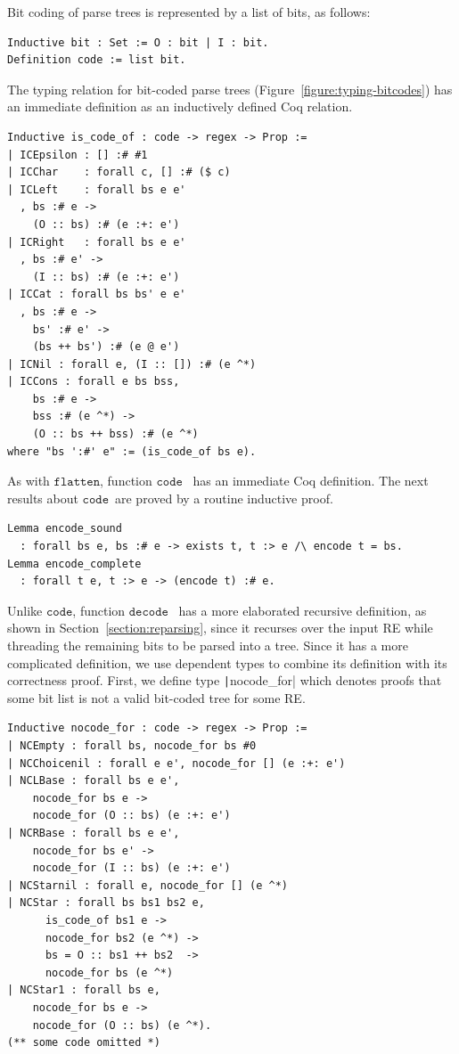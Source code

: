 \documentclass[oneside,12pt]{scrbook}
\theoremstyle{definition}
\newcommand{\flatten}{\ensuremath{\texttt{flatten}}}
\newcommand{\code}{\ensuremath{\texttt{code}}}
\newcommand{\decodee}{\ensuremath{\texttt{decode}}}
\newcommand{\coq}[1]{\texttt|#1|}
\theoremstyle{plain}
\theoremstyle{definition}
\begin{document}
Bit coding of parse trees is represented by a list of bits, as follows:
\begin{verbatim}
Inductive bit : Set := O : bit | I : bit.
Definition code := list bit.
\end{verbatim}
The typing relation for bit-coded parse trees
(Figure~\ref{figure:typing-bitcodes}) has an immediate definition as an
inductively defined Coq relation.
\begin{verbatim}
Inductive is_code_of : code -> regex -> Prop :=
| ICEpsilon : [] :# #1
| ICChar    : forall c, [] :# ($ c)
| ICLeft    : forall bs e e'
  , bs :# e ->
    (O :: bs) :# (e :+: e')
| ICRight   : forall bs e e'
  , bs :# e' ->
    (I :: bs) :# (e :+: e')
| ICCat : forall bs bs' e e'
  , bs :# e ->
    bs' :# e' ->
    (bs ++ bs') :# (e @ e')
| ICNil : forall e, (I :: []) :# (e ^*)
| ICCons : forall e bs bss, 
    bs :# e -> 
    bss :# (e ^*) -> 
    (O :: bs ++ bss) :# (e ^*) 
where "bs ':#' e" := (is_code_of bs e).
\end{verbatim}
As with \flatten, function \code~ has an immediate Coq definition. The next
results about \code~are proved by a routine inductive proof.
\begin{verbatim}
Lemma encode_sound
  : forall bs e, bs :# e -> exists t, t :> e /\ encode t = bs.
Lemma encode_complete
  : forall t e, t :> e -> (encode t) :# e.   
\end{verbatim}
Unlike \code, function \decodee~ has a more elaborated recursive definition, as
shown in Section~\ref{section:reparsing}, since it recurses over the
input RE while threading the remaining bits to be parsed into a tree. Since it
has a more complicated definition, we use dependent types to combine its definition
with its correctness proof. First, we define type \coq{nocode_for} which
denotes proofs that some bit list is not a valid bit-coded tree for some RE.
\begin{verbatim}
Inductive nocode_for : code -> regex -> Prop :=
| NCEmpty : forall bs, nocode_for bs #0
| NCChoicenil : forall e e', nocode_for [] (e :+: e')
| NCLBase : forall bs e e', 
    nocode_for bs e -> 
    nocode_for (O :: bs) (e :+: e')
| NCRBase : forall bs e e', 
    nocode_for bs e' -> 
    nocode_for (I :: bs) (e :+: e')
| NCStarnil : forall e, nocode_for [] (e ^*)
| NCStar : forall bs bs1 bs2 e,
      is_code_of bs1 e ->
      nocode_for bs2 (e ^*) ->
      bs = O :: bs1 ++ bs2  ->
      nocode_for bs (e ^*)
| NCStar1 : forall bs e,
    nocode_for bs e ->
    nocode_for (O :: bs) (e ^*).
(** some code omitted *)
\end{verbatim}
\end{document}
